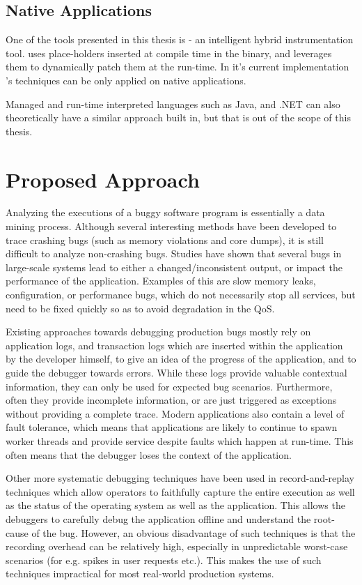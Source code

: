 \subsection{Native Applications}
\label{sec:introScopeNative}

One of the tools presented in this thesis is \iprobe - an intelligent hybrid instrumentation tool. 
\iprobe uses place-holders inserted at compile time in the binary, and leverages them to dynamically patch them at the run-time.
In it's current implementation \iprobe's techniques can be only applied on native applications.

Managed and run-time interpreted languages such as Java, and .NET can also theoretically have a similar approach built in, but that is out of the scope of this thesis.


\section{Proposed Approach}
\label{sec:introApproach}

Analyzing the executions of a buggy software program is essentially a data mining process.
Although several interesting methods have been developed to trace crashing bugs (such as memory violations and core dumps), it is still difficult to analyze non-crashing bugs.
Studies have shown that several bugs in large-scale systems lead to either a changed/inconsistent output, or impact the performance of the application.
Examples of this  are slow memory leaks, configuration, or performance bugs, which do not necessarily stop all services, but need to be fixed quickly so as to avoid degradation in the QoS.

Existing approaches towards debugging production bugs mostly rely on application logs, and transaction logs which are inserted within the application by the developer himself, to give an idea of the progress of the application, and to guide the debugger towards errors.
While these logs provide valuable contextual information, they can only be used for expected bug scenarios.
Furthermore, often they provide incomplete information, or are just triggered as exceptions without providing a complete trace.
Modern applications also contain a level of fault tolerance, which means that applications are likely to continue to spawn worker threads and provide service despite faults which happen at run-time.
This often means that the debugger loses the context of the application.

Other more systematic debugging techniques have been used in record-and-replay techniques which allow operators to faithfully capture the entire execution as well as the status of the operating system as well as the application.
This allows the debuggers to carefully debug the application offline and understand the root-cause of the bug.
However, an obvious disadvantage of such techniques is that the recording overhead can be relatively high, especially in unpredictable worst-case scenarios (for e.g. spikes in user requests etc.).
This makes the use of such techniques impractical for most real-world production systems.

